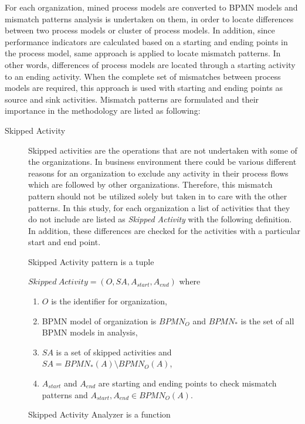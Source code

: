 For each organization, mined process models are converted to BPMN models and mismatch patterns analysis is undertaken on them, in order to locate differences between two process models or cluster of process models. In addition, since performance indicators are calculated based on a starting and ending points in the process model, same approach is applied to locate mismatch patterns. In other words, differences of process models are located through a starting activity to an ending activity. When the complete set of mismatches between process models are required, this approach is used with starting and ending points as source and sink activities. Mismatch patterns are formulated and their importance in the methodology are listed as following:
\begin{description}
  \item[Skipped Activity] Skipped activities are the operations that are not undertaken with some of the organizations. In business environment there could be various different reasons for an organization to exclude any activity in their process flows which are followed by other organizations. Therefore, this mismatch pattern should not be utilized solely but taken in to care with the other patterns. In this study, for each organization a list of activities that they do not include are listed as \textit{Skipped Activity} with the following definition. In addition, these differences are checked for the activities with a particular start and end point. 
		\theoremstyle{definition}
		\begin{definition}
		Skipped Activity pattern is a tuple 

		${Skipped\ Activity} = (O, SA, A_{start}, A_{end}) $ where 
		\begin{enumerate}
		  \item $O$ is the identifier for organization,
		  \item BPMN model of organization is $BPMN_{O}$ and $BPMN_{*}$ is the set of all BPMN models in analysis,
		  \item $SA$ is a set of skipped activities and $SA =  BPMN_{*}(A) \setminus BPMN_{O}(A)$,
		  \item $A_{start}$ and $A_{end}$ are starting and ending points to check mismatch patterns and $A_{start}, A_{end} \in BPMN_{O}(A)$.
		\end{enumerate}
		\end{definition}

		\theoremstyle{definition}
		\begin{definition}
		Skipped Activity Analyzer is a function 


\end{definition}
\end{description}
